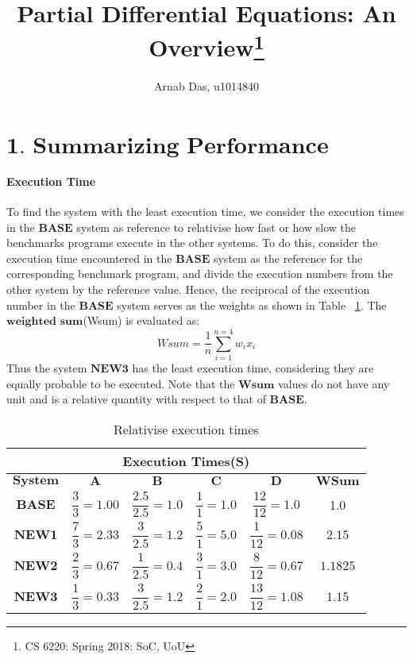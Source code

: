 \documentclass{tufte-handout}
\title{Partial Differential Equations: An Overview\thanks{CS 6220: Spring 2018: SoC, UoU}}
\author[]{Arnab Das, u1014840}
\begin{document}
  
  \maketitle%
  

 \setcounter{secnumdepth}{1}


\section{$\textbf{1. Summarizing Performance Numbers}$}
	 \paragraph{Execution Time} To find the system with the least execution time, we consider the execution times in the $\textbf{BASE}$ system as reference to relativise how fast or how slow the benchmarks programs execute in the other systems. To do this, consider the execution time encountered in the $\textbf{BASE}$ system as the reference for the corresponding benchmark program, and divide the execution numbers from the other system by the reference value. Hence, the reciprocal of the execution number in the $\textbf{BASE}$ system serves as the weights as shown in Table ~\ref{tab:exec-time}. The $\textbf{weighted sum}$(Wsum) is evaluated as:
		\[ Wsum = \dfrac{1}{n} \sum_{i=1}^{n=4} w_i x_i\]
	Thus the system $\textbf{NEW3}$ has the least execution  time, considering they are equally probable to be executed. Note that the $\textbf{Wsum}$ values do not have any unit and is a relative quantity with respect to that of $\textbf{BASE}$.

	\begin{table}[!h]
	    \centering
	    \selectfont
		\renewcommand{\arraystretch}{3.0}
		\label{tab:exec-time}
	    \begin{tabular}{c|c|c|c|c|c}
	      \toprule
		  \multicolumn{6}{|c|}{Execution Times(S)}  \\
	      \midrule 
		  $\textbf{System}$ & $\textbf{A}$ & $\textbf{B}$ & $\textbf{C}$ & $\textbf{D}$ & $\textbf{WSum}$ \\  %
		  $\textbf{BASE}$ & $\dfrac{3}{3}=1.00$ & $\dfrac{2.5}{2.5}=1.0$ & $\dfrac{1}{1} = 1.0$ & $\dfrac{12}{12} = 1.0$ & 1.0 \\ 
		  $\textbf{NEW1}$ & $\dfrac{7}{3}=2.33$ & $\dfrac{3}{2.5} = 1.2$ & $\dfrac{5}{1} = 5.0$ & $\dfrac{1}{12} = 0.08$ & $2.15$ \\ 
		  $\textbf{NEW2}$ & $\dfrac{2}{3}=0.67$ & $\dfrac{1}{2.5} = 0.4$ & $\dfrac{3}{1} = 3.0$ & $\dfrac{8}{12} = 0.67$ & $1.1825$ \\ 
		  $\textbf{NEW3}$ & $\dfrac{1}{3}=0.33$ & $\dfrac{3}{2.5} = 1.2$ & $\dfrac{2}{1} = 2.0$ & $\dfrac{13}{12} = 1.08$ & $1.15$ \\
	      \bottomrule
	    \end{tabular}
	    \caption{ Relativise execution times }
	  \end{table}
\end{document}
